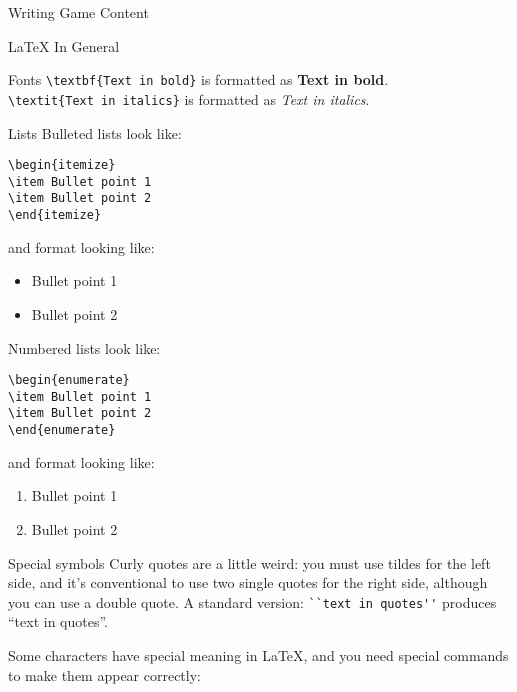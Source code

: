 \documentclass[11pt]{article}
\begin{document}
\begin{section}{Writing Game Content}
\begin{subsection}{\LaTeX{} In General}
\begin{subsubsection}{Fonts}
\lstinline|\textbf{Text in bold}| is formatted as \textbf{Text in bold}.\\
\lstinline|\textit{Text in italics}| is formatted as \textit{Text in italics}.
\end{subsubsection}
\begin{subsubsection}{Lists}
Bulleted lists look like:
\begin{verbatim}
\begin{itemize}
\item Bullet point 1
\item Bullet point 2
\end{itemize}
\end{verbatim}
and format looking like:
\begin{itemize}
\item Bullet point 1
\item Bullet point 2
\end{itemize}
Numbered lists look like:
\begin{verbatim}
\begin{enumerate}
\item Bullet point 1
\item Bullet point 2
\end{enumerate}
\end{verbatim}
and format looking like:
\begin{enumerate}
\item Bullet point 1
\item Bullet point 2
\end{enumerate}
\end{subsubsection}
\begin{subsubsection}{Special symbols}
Curly quotes are a little weird: you must use tildes for the left side, and it's conventional to use two single quotes for the right side, although you can use a double quote.  A standard version: \lstinline{``text in quotes''} produces ``text in quotes''.

Some characters have special meaning in \LaTeX{}, and you need special commands to make them appear correctly:


\end{subsubsection}
\end{subsection}
\end{section}
\end{document}
